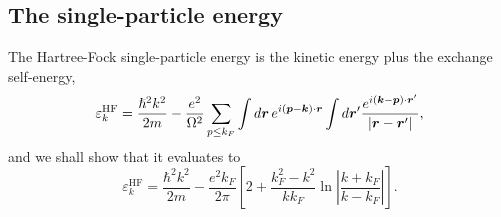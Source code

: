 \subsection{The single-particle energy}
\label{sec:egsingleparticle}

The Hartree-Fock single-particle energy is the kinetic energy plus the
exchange self-energy,
\begin{equation}
  \varepsilon_{k}^{\mathrm{HF}}
   = \frac{\hslash^2k^2}{2m}
   - \frac{e^2}{\Omega^2}\sum_{p\le k_F}
     \int d\bm{r}\,e^{i(\bm{p}-\bm{k})\cdot\bm{r}}
     \int d\bm{r}'
     \frac{e^{i(\bm{k}-\bm{p})\cdot\bm{r}'}}
          {\vert\bm{r}-\bm{r}'\vert},
  \label{eq:6-egsp}
\end{equation}
and we shall show that it evaluates to
\begin{equation}
  \boxed{\;
  \varepsilon_{k}^{\mathrm{HF}}
   = \frac{\hbar^2k^2}{2m}
   - \frac{e^2k_F}{2\pi}\left[2
     + \frac{k_F^2-k^2}{kk_F}
       \ln\left\vert\frac{k+k_F}{k-k_F}\right\vert\right].
  \;}
  \label{eq:6-egspclosed}
\end{equation}

